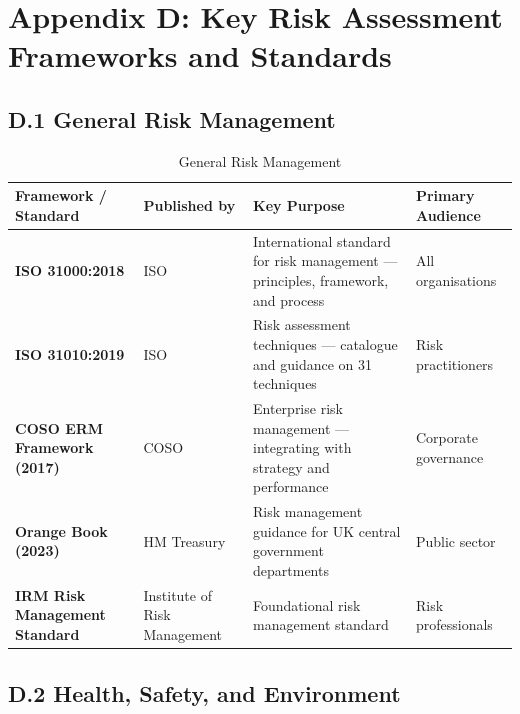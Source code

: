 \chapter*{Appendix D: Key Risk Assessment Frameworks and Standards}
\label{chap:Appendix D: Key Risk Assessment Frameworks and Standards}

\section*{D.1 General Risk Management}

\begin{table}[H]
  \centering
  \renewcommand{\arraystretch}{1.5}
  \begin{tabularx}{\textwidth}{ | >{\raggedright\arraybackslash}p{} 
								| >{\raggedright\arraybackslash}p{} 
								| >{\raggedright\arraybackslash}p{} 
                                | >{\raggedright\arraybackslash}X | }
    \hline
    \textbf{Framework / Standard} & \textbf{Published by} & \textbf{Key Purpose} & \textbf{Primary Audience} \\
    \hline
    \textbf{ISO 31000:2018} & ISO & International standard for risk management — principles, framework, and process & All organisations\\
    \hline
    \textbf{ISO 31010:2019} & ISO & Risk assessment techniques — catalogue and guidance on 31 techniques & Risk practitioners\\
    \hline
    \textbf{COSO ERM Framework (2017)} & COSO & Enterprise risk management — integrating with strategy and performance & Corporate governance\\
    \hline
    \textbf{Orange Book (2023)} & HM Treasury & Risk management guidance for UK central government departments & Public sector\\
    \hline
    \textbf{IRM Risk Management Standard} & Institute of Risk Management & Foundational risk management standard & Risk professionals\\
    \hline
  \end{tabularx}
  \caption{General Risk Management}
\end{table}

\section*{D.2 Health, Safety, and Environment}

